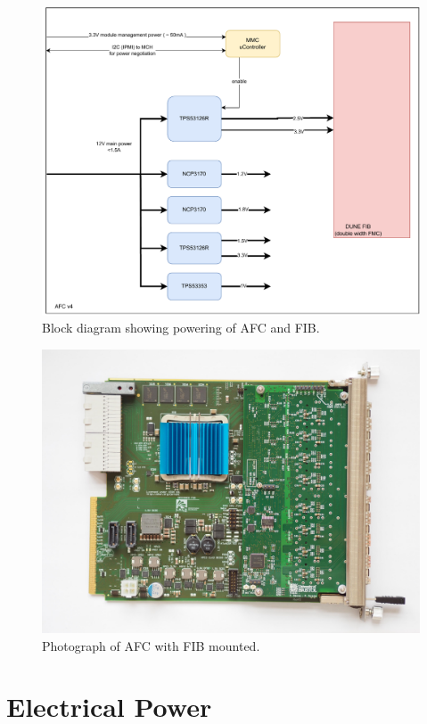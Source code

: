 \documentclass[fleqn,12pt,a4paper]{olplainarticle}
\begin{document}
\begin{figure}
  \centering
  \includegraphics[width=\linewidth]{dts_afc_fib_power_block_diagram_v2-240116.drawio.pdf}
  \caption{Block diagram showing powering of AFC and FIB.}
  \label{fig:dts-afc_fib-powering}
\end{figure}

\begin{figure}
  \centering
  \includegraphics[width=0.8\linewidth]{OI000296.JPG}
  \caption{Photograph of AFC with FIB mounted.}
  \label{fig:dts-afc_fib-photo}
\end{figure}

\section{Electrical Power}
\end{document}
